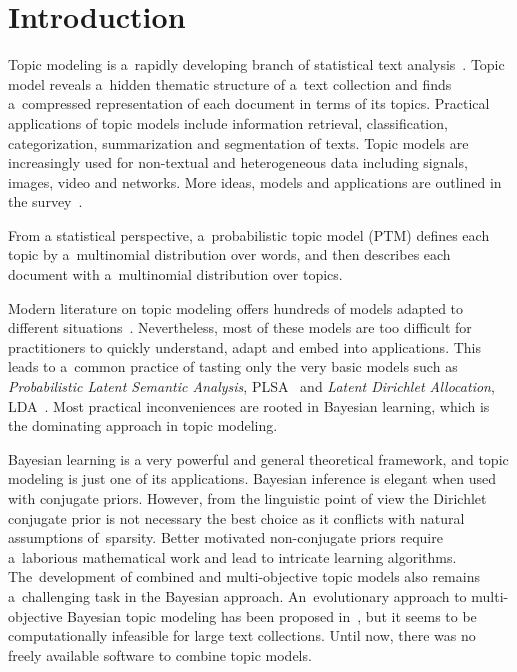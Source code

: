 \documentclass{sig-alternate-2013}
\begin{document}



\section{Introduction}
Topic modeling is a~rapidly developing branch of statistical text analysis~\cite{blei12ptm}.
Topic model reveals a~hidden thematic structure of a~text collection
and finds a~compressed representation of each document in terms of its topics.
Practical applications of topic models include
information retrieval,
classification, categorization, summarization and segmentation of texts.
Topic models are increasingly used for non-textual and heterogeneous data
including signals, images, video and networks.
More ideas, models and applications are outlined in the survey~\cite{daud10knowledge}.

From a statistical perspective,
a~probabilistic topic model (PTM)
defines each topic by a~multinomial distribution over words,
and then describes each document with a~multinomial distribution over topics.

Modern literature on topic modeling offers
hundreds of models adapted to different situations~\cite{daud10knowledge}.
Nevertheless,
most of these models are too difficult for practitioners
to quickly understand, adapt and embed into applications.
This leads to a~common practice of tasting only the very basic models such as
\emph{Probabilistic Latent Semantic Analysis}, PLSA~\cite{hofmann99plsi} and
\emph{Latent Dirichlet Allocation}, LDA~\cite{blei03latent}.
Most practical inconveniences are rooted in Bayesian learning,
which is the dominating approach in topic modeling.

Bayesian learning is a very powerful and general theoretical framework,
and topic modeling is just one of its applications.
Bayesian inference is elegant when used with conjugate priors.
However, from the linguistic point of view the Dirichlet conjugate prior
is not necessary the best choice
as it conflicts with natural assumptions of~sparsity.
Better motivated non-conjugate priors
require a~laborious mathematical work and
lead to intricate learning algorithms.
The~development of combined and multi-objective topic models also remains a~challenging task in the Bayesian approach.
An~evolutionary approach to multi-objective Bayesian topic modeling has been proposed in~\cite{khalifa13multi},
but it seems to be computationally infeasible for large text collections.
Until now, there was no freely available software to combine topic \mbox{models}.
\end{document}
